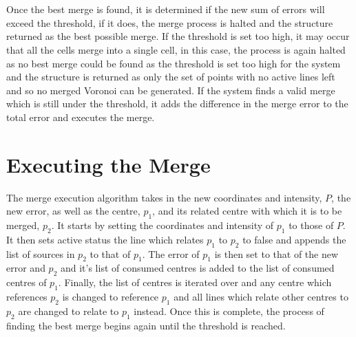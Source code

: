 \\
\\
Once the best merge is found, it is determined if the new sum of errors will exceed the threshold, if it does, the merge process is halted and the structure returned as the best possible merge. If the threshold is set too high, it may occur that all the cells merge into a single cell, in this case, the process is again halted as no best merge could be found as the threshold is set too high for the system and the structure is returned as only the set of points with no active lines left and so no merged Voronoi can be generated. If the system finds a valid merge which is still under the threshold, it adds the difference in the merge error to the total error and executes the merge.

\section{Executing the Merge}
The merge execution algorithm takes in the new coordinates and intensity, $P$, the new error, as well as the centre, $p_1$, and its related centre with which it is to be merged, $p_2$. It starts by setting the coordinates and intensity of $p_1$ to those of $P$. It then sets active status the line which relates $p_1$ to $p_2$ to false and appends the list of sources in $p_2$ to that of $p_1$. The error of $p_1$ is then set to that of the new error and $p_2$ and it's list of consumed centres is added to the list of consumed centres of $p_1$. Finally, the list of centres is iterated over and any centre which references $p_2$ is changed to reference $p_1$ and all lines which relate other centres to $p_2$ are changed to relate to $p_1$ instead. Once this is complete, the process of finding the best merge begins again until the threshold is reached.
